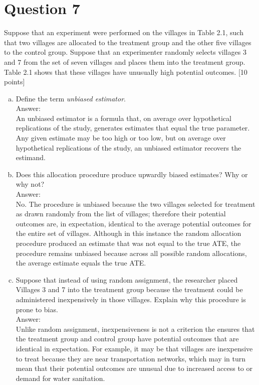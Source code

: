 \documentclass[11pt,notitlepage]{article}		%
\begin{document}
\section*{Question 7}
Suppose that an experiment were performed on the villages in Table 2.1, such that two villages are allocated to the treatment group and the other five villages to the control group. Suppose that an experimenter randomly selects villages 3 and 7 from the set of seven villages and places them into the treatment group.  Table 2.1 shows that these villages have unusually high potential outcomes. [10 points]
\begin{enumerate}[a)]
\item Define the term \textit{unbiased estimator}.\\
Answer:\\
An unbiased estimator is a formula that, on average over hypothetical replications of the study, generates estimates that equal the true parameter. Any given estimate may be too high or too low, but on average over hypothetical replications of the study, an unbiased estimator recovers the estimand.
\item Does this allocation procedure produce upwardly biased estimates?  Why or why not? \\
Answer:\\
No.  The procedure is unbiased because the two villages selected for treatment as drawn randomly from the list of villages; therefore their potential outcomes are, in expectation, identical to the average potential outcomes for the entire set of villages.  Although in this instance the random allocation procedure produced an estimate that was not equal to the true ATE, the procedure remains unbiased because across all possible random allocations, the average estimate equals the true ATE.
\item Suppose that instead of using random assignment, the researcher placed Villages 3 and 7 into the treatment group because the treatment could be administered inexpensively in those villages.  Explain why this procedure is prone to bias. \\
Answer:\\
Unlike random assignment, inexpensiveness is not a criterion the ensures that the treatment group and control group have potential outcomes that are identical in expectation. For example, it may be that villages are inexpensive to treat because they are near transportation networks, which may in turn mean that their potential outcomes are unusual due to increased access to or demand for water sanitation.
\end{enumerate}
\end{document}

